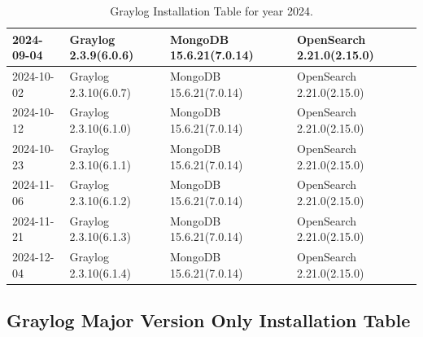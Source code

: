 \documentclass[../main.tex]{subfiles}
\begin{document}
\begin{table}[h]
\begin{tabular}{|l|l|l|l|}
    2024-09-04 & Graylog 2.3.9(6.0.6) & MongoDB 15.6.21(7.0.14) & OpenSearch 2.21.0(2.15.0) \\ \hline
    2024-10-02 & Graylog 2.3.10(6.0.7) & MongoDB 15.6.21(7.0.14) & OpenSearch 2.21.0(2.15.0) \\ \hline
    2024-10-12 & Graylog 2.3.10(6.1.0) & MongoDB 15.6.21(7.0.14) & OpenSearch 2.21.0(2.15.0) \\ \hline
    2024-10-23 & Graylog 2.3.10(6.1.1) & MongoDB 15.6.21(7.0.14) & OpenSearch 2.21.0(2.15.0) \\ \hline
    2024-11-06 & Graylog 2.3.10(6.1.2) & MongoDB 15.6.21(7.0.14) & OpenSearch 2.21.0(2.15.0) \\ \hline
    2024-11-21 & Graylog 2.3.10(6.1.3) & MongoDB 15.6.21(7.0.14) & OpenSearch 2.21.0(2.15.0) \\ \hline
    2024-12-04 & Graylog 2.3.10(6.1.4) & MongoDB 15.6.21(7.0.14) & OpenSearch 2.21.0(2.15.0) \\ \hline
    \end{tabular}
    \caption{Graylog Installation Table for year 2024.}
    \label{table:installation_table_2024}
\end{table}

\subsection{Graylog Major Version Only Installation Table}
\end{document}
